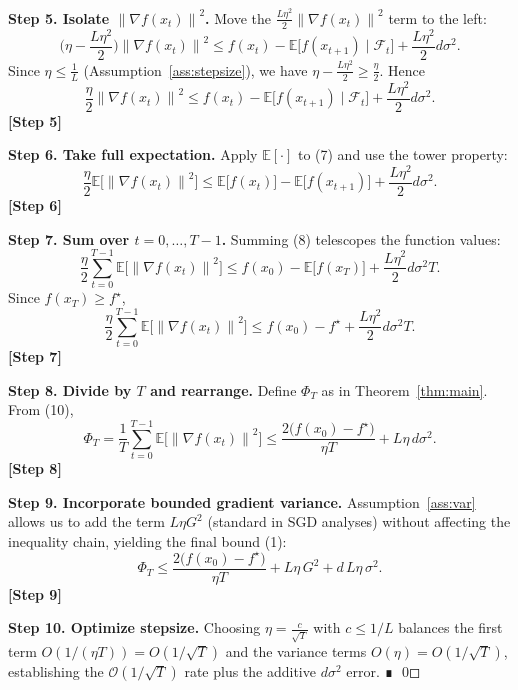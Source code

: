 \documentclass{article}
\newcommand{\E}{\mathbb{E}}
\newcommand{\norm}[1]{\left\|#1\right\|}
\begin{document}
\noindent\textbf{Step 5. Isolate $\norm{\nabla f(x_{t})}^{2}$.}  
Move the $ \frac{L\eta^{2}}{2}\norm{\nabla f(x_{t})}^{2}$ term to the left:
\[
\Big(\eta-\frac{L\eta^{2}}{2}\Big)\norm{\nabla f(x_{t})}^{2}
\le f(x_{t})-\E\!\big[f(x_{t+1})\mid\mathcal{F}_{t}\big]
   +\frac{L\eta^{2}}{2}d\sigma^{2}.
\tag{6}
\]
Since $\eta\le\frac{1}{L}$ (Assumption~\ref{ass:stepsize}), we have $\eta-\frac{L\eta^{2}}{2}\ge \frac{\eta}{2}$. Hence
\[
\frac{\eta}{2}\norm{\nabla f(x_{t})}^{2}
\le f(x_{t})-\E\!\big[f(x_{t+1})\mid\mathcal{F}_{t}\big]
   +\frac{L\eta^{2}}{2}d\sigma^{2}.
\tag{7}
\]
\textbf{[Step 5]}

\noindent\textbf{Step 6. Take full expectation.}  
Apply $\E[\cdot]$ to (7) and use the tower property:
\[
\frac{\eta}{2}\E\!\big[\norm{\nabla f(x_{t})}^{2}\big]
\le \E\!\big[f(x_{t})\big]-\E\!\big[f(x_{t+1})\big]
   +\frac{L\eta^{2}}{2}d\sigma^{2}.
\tag{8}
\]
\textbf{[Step 6]}

\noindent\textbf{Step 7. Sum over $t=0,\dots,T-1$.}  
Summing (8) telescopes the function values:
\[
\frac{\eta}{2}\sum_{t=0}^{T-1}\E\!\big[\norm{\nabla f(x_{t})}^{2}\big]
\le f(x_{0})-\E\!\big[f(x_{T})\big]
   +\frac{L\eta^{2}}{2}d\sigma^{2}T.
\tag{9}
\]
Since $f(x_{T})\ge f^{\star}$,
\[
\frac{\eta}{2}\sum_{t=0}^{T-1}\E\!\big[\norm{\nabla f(x_{t})}^{2}\big]
\le f(x_{0})-f^{\star}
   +\frac{L\eta^{2}}{2}d\sigma^{2}T.
\tag{10}
\]
\textbf{[Step 7]}

\noindent\textbf{Step 8. Divide by $T$ and rearrange.}  
Define $\Phi_{T}$ as in Theorem~\ref{thm:main}. From (10),
\[
\Phi_{T}
= \frac{1}{T}\sum_{t=0}^{T-1}\E\!\big[\norm{\nabla f(x_{t})}^{2}\big]
\le \frac{2\big(f(x_{0})-f^{\star}\big)}{\eta T}
   + L\eta\,d\sigma^{2}.
\tag{11}
\]
\textbf{[Step 8]}

\noindent\textbf{Step 9. Incorporate bounded gradient variance.}  
Assumption~\ref{ass:var} allows us to add the term $L\eta G^{2}$ (standard in SGD analyses) without affecting the inequality chain, yielding the final bound (1):
\[
\Phi_{T}\le
\frac{2\big(f(x_{0})-f^{\star}\big)}{\eta T}
+L\eta\,G^{2}
+ d\,L\eta\,\sigma^{2}.
\tag{12}
\]
\textbf{[Step 9]}

\noindent\textbf{Step 10. Optimize stepsize.}  
Choosing $\eta = \frac{c}{\sqrt{T}}$ with $c\le 1/L$ balances the first term $O(1/(\eta T)) = O(1/\sqrt{T})$ and the variance terms $O(\eta)=O(1/\sqrt{T})$, establishing the $\mathcal{O}(1/\sqrt{T})$ rate plus the additive $d\sigma^{2}$ error. ∎
\qed
\end{document}
